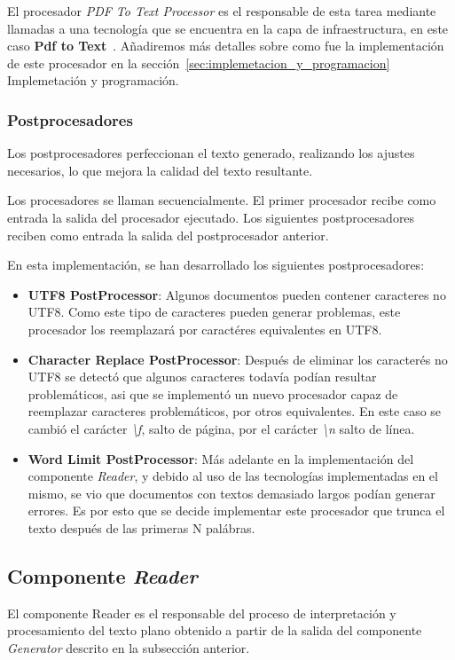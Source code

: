 El procesador \textit{PDF To Text Processor} es el responsable de esta tarea mediante llamadas a una tecnología que se
encuentra en la capa de infraestructura, en este caso
\textbf{Pdf to Text}~\cite{https://www.xpdfreader.com/pdftotext-man.html}.
Añadiremos más detalles sobre como fue la implementación de este procesador en la
sección~\ref{sec:implemetacion_y_programacion} Implemetación y programación.

\subsubsection*{Postprocesadores}

Los postprocesadores perfeccionan el texto generado, realizando los ajustes necesarios, lo que mejora la calidad del
texto resultante.

Los procesadores se llaman secuencialmente.
El primer procesador recibe como entrada la salida del procesador ejecutado.
Los siguientes postprocesadores reciben como entrada la salida del postprocesador anterior.

En esta implementación, se han desarrollado los siguientes postprocesadores:

\begin{itemize}
    \item \textbf{UTF8 PostProcessor}: Algunos documentos pueden contener caracteres no UTF8. Como este tipo de
    caracteres pueden generar problemas, este procesador los reemplazará por caractéres equivalentes en UTF8.
    \item \textbf{Character Replace PostProcessor}: Después de eliminar los caracterés no UTF8 se detectó que algunos
    caracteres todavía podían resultar problemáticos, asi que se implementó un nuevo procesador capaz de reemplazar
    caracteres problemáticos, por otros equivalentes.
    En este caso se cambió el carácter \textit{\textbackslash f}, salto de página, por el carácter
    \textit{\textbackslash n} salto de línea.
    \item \textbf{Word Limit PostProcessor}: Más adelante en la implementación del componente \textit{Reader}, y debido
    al uso de las tecnologías implementadas en el mismo, se vio que documentos con textos demasiado largos podían
    generar errores.
    Es por esto que se decide implementar este procesador que trunca el texto después de las primeras N palábras.
\end{itemize}

\subsection*{Componente \textit{Reader}}\label{subsec:chapter_4.reader_component}
El componente Reader es el responsable del proceso de interpretación y procesamiento del texto plano obtenido a
partir de la salida del componente \textit{Generator} descrito en la subsección anterior.

